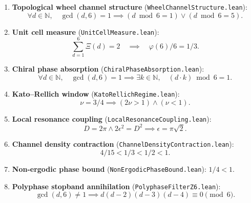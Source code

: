 \documentclass[11pt,a4paper]{article}
\newcommand{\N}{\mathbb{N}}
\begin{document}
\begin{enumerate}
    \item \textbf{Topological wheel channel structure} (\texttt{WheelChannelStructure.lean}):
    \begin{equation}
    \forall d \in \N, \quad \gcd(d, 6) = 1 \implies (d \bmod 6 = 1) \lor (d \bmod 6 = 5).
    \end{equation}

    \item \textbf{Unit cell measure} (\texttt{UnitCellMeasure.lean}):
    \begin{equation}
    \sum_{d=1}^{6} \Xi(d) = 2 \quad \implies \quad \varphi(6)/6 = 1/3.
    \end{equation}

    \item \textbf{Chiral phase absorption} (\texttt{ChiralPhaseAbsorption.lean}):
    \begin{equation}
    \forall d \in \N, \quad \gcd(d, 6) = 1 \implies \exists k \in \N, \quad (d \cdot k) \bmod 6 = 1.
    \end{equation}

    \item \textbf{Kato--Rellich window} (\texttt{KatoRellichRegime.lean}):
    \begin{equation}
    \nu = 3/4 \implies (2\nu > 1) \land (\nu < 1).
    \end{equation}

    \item \textbf{Local resonance coupling} (\texttt{LocalResonanceCoupling.lean}):
    \begin{equation}
    D = 2\pi \land 2\epsilon^2 = D^2 \implies \epsilon = \pi\sqrt{2}.
    \end{equation}

    \item \textbf{Channel density contraction} (\texttt{ChannelDensityContraction.lean}):
    \begin{equation}
    4/15 < 1/3 < 1/2 < 1.
    \end{equation}

    \item \textbf{Non-ergodic phase bound} (\texttt{NonErgodicPhaseBound.lean}): $1/4 < 1$.

    \item \textbf{Polyphase stopband annihilation} (\texttt{PolyphaseFilterZ6.lean}):
    \begin{equation}
    \gcd(d, 6) \neq 1 \implies d(d-2)(d-3)(d-4) \equiv 0 \pmod 6.
    \end{equation}
\end{enumerate}
\end{document}
